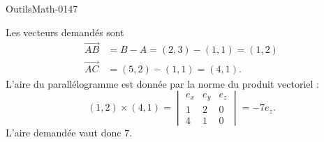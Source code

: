 
\begin{corrige}{OutilsMath-0147}

    Les vecteurs demandés sont
    \begin{subequations}
        \begin{align}
            \overrightarrow{AB}&=B-A=(2,3)-(1,1)=(1,2)\\
            \overrightarrow{AC}&=(5,2)-(1,1)=(4,1).
        \end{align}
    \end{subequations}
    L'aire du parallélogramme est donnée par la norme du produit vectoriel :
    \begin{equation}
        (1,2)\times (4,1)=\begin{vmatrix}
            e_x    &   e_y    &   e_z    \\
            1    &   2    &   0    \\
            4    &   1    &   0
        \end{vmatrix}=-7e_z.
    \end{equation}
    L'aire demandée vaut donc \( 7\).

\end{corrige}
